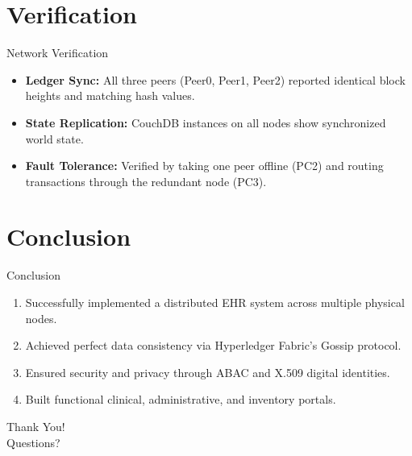 \documentclass{beamer}
\begin{document}
\section{Verification}
\begin{frame}{Network Verification}
    \begin{itemize}
        \item \textbf{Ledger Sync:} All three peers (Peer0, Peer1, Peer2) reported identical block heights and matching hash values.
        \item \textbf{State Replication:} CouchDB instances on all nodes show synchronized world state.
        \item \textbf{Fault Tolerance:} Verified by taking one peer offline (PC2) and routing transactions through the redundant node (PC3).
    \end{itemize}
\end{frame}

\section{Conclusion}
\begin{frame}{Conclusion}
    \begin{enumerate}
        \item Successfully implemented a distributed EHR system across multiple physical nodes.
        \item Achieved perfect data consistency via Hyperledger Fabric's Gossip protocol.
        \item Ensured security and privacy through ABAC and X.509 digital identities.
        \item Built functional clinical, administrative, and inventory portals.
    \end{enumerate}
\end{frame}

\begin{frame}
    \centering
    \Huge Thank You! \\
    \vspace{20pt}
    \Large Questions?
\end{frame}
\end{document}
